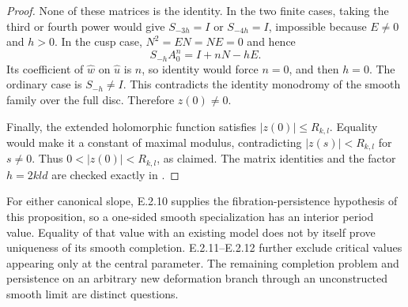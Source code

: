 \begin{proof}
None of these matrices is the identity.  In the two
finite cases, taking the third or fourth power would
give $S_{-3h}=I$ or $S_{-4h}=I$, impossible because
$E\ne0$ and $h>0$.  In the cusp case, $N^2=EN=NE=0$
and hence
\[
 S_{-h}A_0^n=I+nN-hE.
\]
Its coefficient of $\widehat w$ on $\widehat u$ is
$n$, so identity would force $n=0$, and then $h=0$.
The ordinary case is $S_{-h}\ne I$.  This contradicts
the identity monodromy of the smooth family over
the full disc.  Therefore $z(0)\ne0$.

Finally, the extended holomorphic function satisfies
$|z(0)|\le R_{k,l}$.  Equality would make it a constant
of maximal modulus, contradicting $|z(s)|<R_{k,l}$
for $s\ne0$.  Thus $0<|z(0)|<R_{k,l}$, as claimed.
The matrix identities and the factor $h=2kld$ are
checked exactly in .
\end{proof}

\begin{remark}
For either canonical slope, E.2.10 supplies the
fibration-persistence hypothesis of this proposition,
so a one-sided smooth specialization has an interior
period value.  Equality of that value with an existing
model does not by itself prove uniqueness of its smooth
completion.  E.2.11--E.2.12 further exclude critical
values appearing only at the central parameter.
The remaining completion problem and persistence on
an arbitrary new deformation branch through an
unconstructed smooth limit are distinct questions.
\end{remark}
